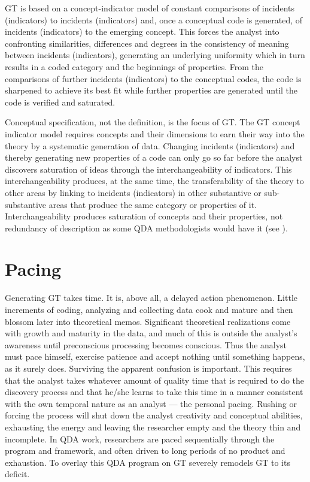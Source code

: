 GT is based on a concept-indicator model of constant comparisons of incidents (indicators) to incidents (indicators) and, 
once a conceptual code is generated,
of incidents (indicators) to the emerging concept. 
This forces the analyst into confronting similarities, 
differences and degrees in the consistency of meaning between incidents (indicators), 
generating an underlying uniformity which in turn results in a coded category and the beginnings of properties. 
From the comparisons of further incidents (indicators) to the conceptual codes, 
the code is sharpened to achieve its best fit while further properties are generated until the code is verified and saturated.

Conceptual specification, not the definition, is the focus of GT. 
The GT concept indicator model requires concepts and their dimensions to earn their way into the theory by a systematic generation of data. 
Changing incidents (indicators) and thereby generating new properties of a code can only go so far before the analyst discovers saturation of ideas through the interchangeability of indicators.
This interchangeability produces, at the same time, the transferability of the theory to other areas by linking to incidents (indicators) in other substantive or sub-substantive areas that produce the same category or properties of it.
Interchangeability produces saturation of concepts and their properties, not redundancy of description as some QDA methodologists would have it 
(see \citep{article.morse95}).

\section* {Pacing}

Generating GT takes time. 
It is, above all, a delayed action phenomenon. 
Little increments of coding, 
analyzing and collecting data cook and mature and then blossom later into theoretical memos. 
Significant theoretical realizations come with growth and maturity in the data, 
and much of this is outside the analyst’s awareness until preconscious processing becomes conscious. 
Thus the analyst must pace himself, 
exercise patience and accept nothing until something happens,  as it surely does. 
Surviving the apparent confusion is important. 
This requires that the analyst takes whatever amount of quality time that 
is required to do the discovery process and that he/she learns 
to take this time in a manner consistent with the own temporal nature as an analyst --- the personal pacing.
Rushing or forcing the process will shut down the analyst creativity and conceptual abilities, 
exhausting the energy and leaving the researcher empty and the theory thin and incomplete. 
In QDA work, researchers are paced sequentially through the program and framework, 
and often driven to long periods of no product and exhaustion. 
To overlay this QDA program on GT severely remodels GT to its deficit.

